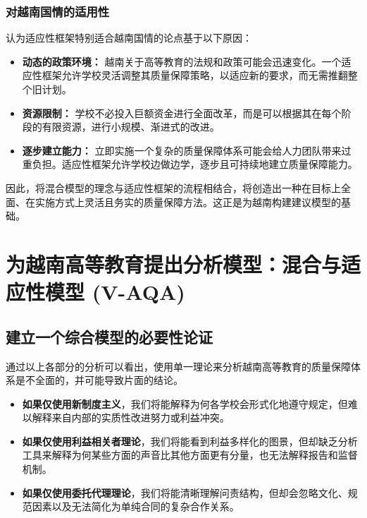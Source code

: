 \subsubsection{对越南国情的适用性}
认为适应性框架特别适合越南国情的论点基于以下原因：
\begin{itemize}
    \item \textbf{动态的政策环境：} 越南关于高等教育的法规和政策可能会迅速变化。一个适应性框架允许学校灵活调整其质量保障策略，以适应新的要求，而无需推翻整个旧计划。
    \item \textbf{资源限制：} 学校不必投入巨额资金进行全面改革，而是可以根据其在每个阶段的有限资源，进行小规模、渐进式的改进。
    \item \textbf{逐步建立能力：} 立即实施一个复杂的质量保障体系可能会给人力团队带来过重负担。适应性框架允许学校边做边学，逐步且可持续地建立质量保障能力。
\end{itemize}
因此，将混合模型的理念与适应性框架的流程相结合，将创造出一种在目标上全面、在实施方式上灵活且务实的质量保障方法。这正是为越南构建建议模型的基础。

\section{为越南高等教育提出分析模型：混合与适应性模型 (V-AQA)}
\label{sec:mo_hinh_V-AQA_de_xuat}

\subsection{建立一个综合模型的必要性论证}
\label{subsec:luan_giai_V-AQA}
通过以上各部分的分析可以看出，使用单一理论来分析越南高等教育的质量保障体系是不全面的，并可能导致片面的结论。
\begin{itemize}
    \item \textbf{如果仅使用新制度主义}，我们将能解释为何各学校会形式化地遵守规定，但难以解释来自内部的实质性改进努力或利益冲突。
    \item \textbf{如果仅使用利益相关者理论}，我们将能看到利益多样化的图景，但却缺乏分析工具来解释为何某些方面的声音比其他方面更有分量，也无法解释报告和监督机制。
    \item \textbf{如果仅使用委托代理理论}，我们将能清晰理解问责结构，但却会忽略文化、规范因素以及无法简化为单纯合同的复杂合作关系。
\end{itemize}

